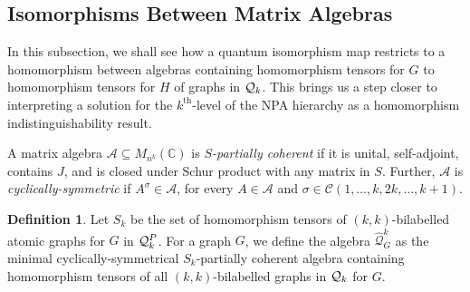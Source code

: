 \documentclass[a4paper,onecolumn,11pt,accepted=2026-01-06]{quantumarticle}
\theoremstyle{plain}
\theoremstyle{remark}
\theoremstyle{definition}
\newtheorem{definition}[thm]{Definition}
\newcommand{\complex}{\mathbb{C}}
\def\calA{{\mathcal A}} \def\calB{{\mathcal B}} \def\calC{{\mathcal C}}
\newcommand{\cyclicpermutations}{\mathscr{C}(1,\dots, k, 2k, \dots, k+1)}
\renewcommand{\epsilon}{\varepsilon}
\begin{document}


























\subsection{Isomorphisms Between Matrix Algebras}

 In this subsection, we shall see how a quantum isomorphism map restricts to a homomorphism between algebras containing homomorphism tensors for $G$ to homomorphism tensors for $H$ of graphs in ${\mathcal Q}_k$. This brings us a step closer to interpreting a solution for the $k^{\text{th}}$-level of the NPA hierarchy as a homomorphism indistinguishability result. 

A matrix algebra $\calA \subseteq M_{n^k}(\complex)$ is \emph{$S$-partially coherent} if it is unital, self-adjoint, contains $J$, and is closed under Schur product with any matrix in $S$. 
Further, $\calA$ is \emph{cyclically-symmetric} if $A^\sigma \in \calA$, for every $A \in \calA$ and $\sigma \in \cyclicpermutations$.

\begin{definition}
  Let $S_k$ be the set of homomorphism tensors of $(k, k)$-bilabelled atomic graphs for $G$ in ${\mathcal Q}_k^P$.
  For a graph $G$, we define the algebra $\widehat{\mathcal{Q}}_G^k$ as the minimal cyclically-symmetrical $S_k$-partially coherent algebra containing homomorphism tensors of all $(k,k)$-bilabelled graphs in ${\mathcal Q}_k$ for $G$.
\end{definition}
\end{document}
